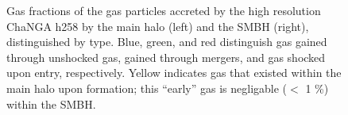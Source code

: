 \documentclass[manuscript]{aastex}
\begin{document}
\begin{figure}
\centerline{}
\caption[]{Gas fractions of the gas particles accreted by the high resolution ChaNGA h258 by the main halo (left) and the SMBH (right), distinguished by type. Blue, green, and red distinguish gas gained through unshocked gas, gained through mergers, and gas shocked upon entry, respectively. Yellow indicates gas that existed within the main halo upon formation; this ``early'' gas is negligable ($<$ 1 \%) within the SMBH.}
\label{hrh258stackfrac} 
\end{figure}
\end{document}
